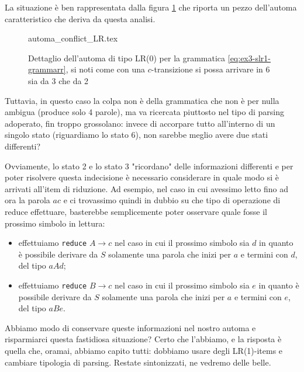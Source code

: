 \documentclass[class=book, crop=false, oneside, 12pt]{standalone}
\begin{document}
La situazione è ben rappresentata dalla figura \ref{fig:lr0-automata_conflict} che riporta un pezzo dell'automa caratteristico che deriva da questa analisi.

\begin{figure}[H]
    \centering
    {automa_conflict_LR.tex}
    \caption{Dettaglio dell'automa di tipo LR(0) per la grammatica \ref{eq:ex3-slr1-grammarr}, si noti come con una \(c\)-transizione si possa arrivare in 6 sia da 3 che da 2}
    \label{fig:lr0-automata_conflict}
\end{figure}

Tuttavia, in questo caso la colpa non è della grammatica che non è per nulla ambigua (produce solo 4 parole), ma va ricercata piuttosto nel tipo di parsing adoperato, fin troppo grossolano: invece di accorpare tutto all'interno di un singolo stato (riguardiamo lo stato 6), non sarebbe meglio avere due stati differenti? 

Ovviamente, lo stato 2 e lo stato 3 "ricordano" delle informazioni differenti e per poter risolvere questa indecisione è necessario considerare in quale modo si è arrivati all'item di riduzione. Ad esempio, nel caso in cui avessimo letto fino ad ora la parola \(ac\) e ci trovassimo quindi in dubbio su che tipo di operazione di reduce effettuare, basterebbe semplicemente poter osservare quale fosse il prossimo simbolo in lettura: 
\begin{itemize}
    \item effettuiamo \texttt{reduce} \(A \to c\) nel caso in cui il prossimo simbolo sia \(d\) in quanto è possibile derivare da \(S\) solamente una parola che inizi per \(a\) e termini con \(d\), del tipo \(aAd\);
    \item effettuiamo \texttt{reduce} \(B \to c\) nel caso in cui il prossimo simbolo sia \(e\) in quanto è possibile derivare da \(S\) solamente una parola che inizi per \(a\) e termini con \(e\), del tipo \(aBe\).
\end{itemize}
Abbiamo modo di conservare queste informazioni nel nostro automa e risparmiarci questa fastidiosa situazione? Certo che l'abbiamo, e la risposta è quella che, oramai, abbiamo capito tutti: dobbiamo usare degli LR(1)-items e cambiare tipologia di parsing. Restate sintonizzati, ne vedremo delle belle.
\end{document}
